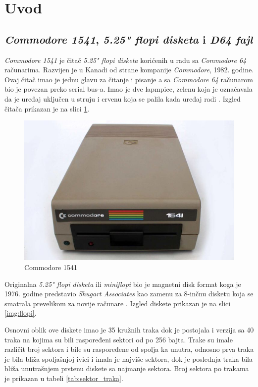 \section{Uvod}

\subsection{\textit{Commodore 1541}, \textit{5.25" flopi disketa} i \textit{D64 fajl}}
\textit{Commodore 1541} je čitač \textit{5.25" flopi disketa} korićenih u radu sa \textit{Commodore 64} računarima. Razvijen je u Kanadi od strane kompanije \textit{Commodore}, 1982. godine. Ovaj čitač imao je jednu glavu za čitanje i pisanje a sa \textit{Commodore 64} računarom bio je povezan preko serial bus-a. Imao je dve lapmpice, zelenu koja je označavala da je uređaj uključen u struju i crvenu koja se palila kada uređaj radi \cite{Commodore1541Text}. Izgled čitača prikazan je na slici \ref{img:commodore1541}.
\begin{figure}[ht]
\begin{center}
\includegraphics[width=\textwidth]{img/Commodore1541.jpg}
\caption[Commodore 1541 \textit{(preuzeto \cite{Commodore1541})}]{Commodore 1541}
\label{img:commodore1541}
\end{center}
\end{figure}

Originalna \textit{5.25" flopi disketa} ili \textit{miniflopi} bio je magnetni disk format koga je 1976. godine predstavio \textit{Shugart Associates} kao zamenu za 8-inčnu disketu koja se smatrala prevelikom za novije računare \cite{5.25Flopi}. Izgled diskete prikazan je na slici \ref{img:flopi}.

Osnovni oblik ove diskete imao je 35 kružnih traka dok je postojala i verzija sa 40 traka na kojima su bili raspoređeni sektori od po 256 bajta. Trake su imale različit broj sektora i bile su raspoređene od spolja ka unutra, odnosno prva traka je bila bliža spoljašnjoj ivici i imala je najviše sektora, dok je poslednja traka bila bliža unutrašnjem prstenu diskete sa najmanje sektora. Broj sektora po trakama je prikazan u tabeli \ref{tab:sektor_traka}.

